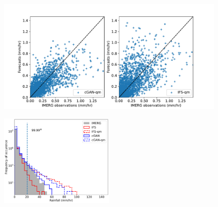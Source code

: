 \documentclass{article}
\begin{document}
\begin{figure}[h]
     \centering
     \includegraphics[width=1.05\textwidth]{images/scatter_cl100-medium-nologs_217600_kenya.pdf}
     
     \caption{
     }
     \label{fig:examples}
\end{figure}

\begin{figure}[ht!]
     \centering
     \includegraphics[width=0.5\textwidth]{images/histograms_final-nologs-mam2018_217600_kenya.pdf}
     
     \caption{
     }
     \label{fig:examples}
\end{figure}

\end{document}
